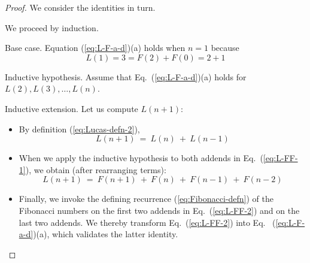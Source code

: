 \begin{proof}
We consider the identities in turn.

We proceed by induction.

\medskip

\noindent
{\sf Base case.}
Equation (\ref{eq:L-F-a-d})(a) holds when $n=1$ because
\[ L(1) = 3 = F(2) + F(0) = 2+1 \]

\medskip

\noindent
{\sf Inductive hypothesis}.
Assume that Eq.~(\ref{eq:L-F-a-d})(a) holds for $L(2), L(3), \ldots, L(n)$.

\medskip

\noindent
{\sf Inductive extension}. 
Let us compute $L(n+1)$:
\begin{itemize}
\item
By definition (\ref{eq:Lucas-defn-2}),
\begin{equation}
\label{eq:L-FF-1}
L(n+1) \ = \ L(n) \ + \ L(n-1)
\end{equation}
\item
When we apply the inductive hypothesis to both addends in Eq.~(\ref{eq:L-FF-1}), we obtain (after rearranging terms):
\begin{equation}
\label{eq:L-FF-2}
L(n+1) \ = \  F(n+1) \ + \ F(n) \ + \ F(n-1) \ + \ F(n-2)
\end{equation}
\item
Finally, we invoke the defining recurrence (\ref{eq:Fibonacci-defn}) of the Fibonacci numbers on the first two addends in Eq.~(\ref{eq:L-FF-2}) and on the last two addends.  We thereby transform Eq.~(\ref{eq:L-FF-2}) into Eq.~ (\ref{eq:L-F-a-d})(a), which validates the latter identity.
\end{itemize}

\bigskip

\noindent {}
\bigskip


\end{proof}
